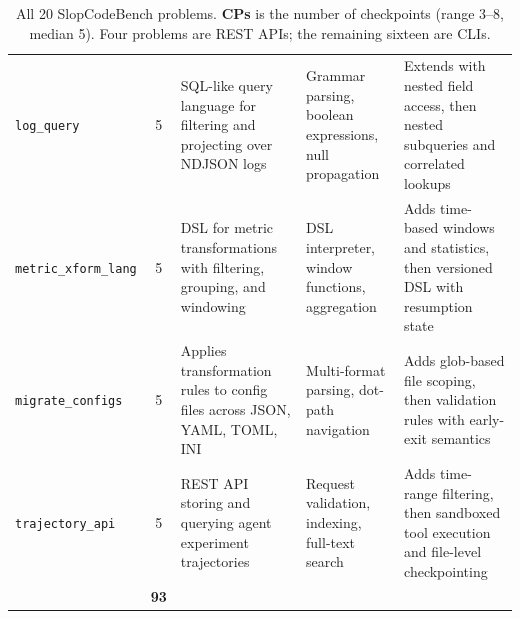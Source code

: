 \begin{table}[h]
\begin{tabular}{lcp{3.6cm}p{3.2cm}p{3.6cm}}
\texttt{log\_query}          & 5 & SQL-like query language for filtering and projecting over NDJSON logs & Grammar parsing, boolean expressions, null propagation & Extends with nested field access, then nested subqueries and correlated lookups \\[4pt]
\texttt{metric\_xform\_lang} & 5 & DSL for metric transformations with filtering, grouping, and windowing & DSL interpreter, window functions, aggregation & Adds time-based windows and statistics, then versioned DSL with resumption state \\[4pt]
\texttt{migrate\_configs}    & 5 & Applies transformation rules to config files across JSON, YAML, TOML, INI & Multi-format parsing, dot-path navigation & Adds glob-based file scoping, then validation rules with early-exit semantics \\[4pt]
\texttt{trajectory\_api}     & 5 & REST API storing and querying agent experiment trajectories & Request validation, indexing, full-text search & Adds time-range filtering, then sandboxed tool execution and file-level checkpointing \\
\midrule
& \textbf{93} & & & \\
\bottomrule
\end{tabular}
\caption{All 20 SlopCodeBench problems. \textbf{CPs} is the number of checkpoints (range 3--8, median 5). Four problems are REST APIs; the remaining sixteen are CLIs.}
\label{tab:problem-overview}
\end{table}
